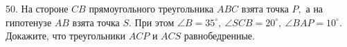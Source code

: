 50. На стороне $CB$ прямоугольного треугольника $ABC$ взята точка $P,$ а на гипотенузе $AB$ взята точка $S.$ При этом $\angle B=35^\circ,\ \angle SCB=20^\circ,\ \angle BAP=10^\circ.$ Докажите, что треугольники $ACP$ и $ACS$ равнобедренные.\\
